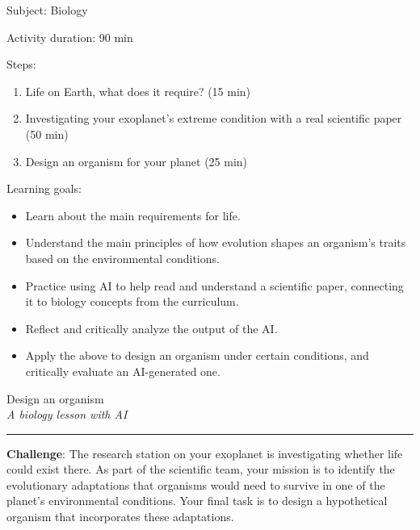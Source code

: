 \documentclass[12pt]{article}
\begin{document}
\vspace*{0.5\textheight}

Subject: Biology


\vspace{0.3cm}

Activity duration: 90 min

\vspace{0.5cm}

Steps:
\begin{enumerate}
    \item Life on Earth, what does it require? (15 min)
    \item Investigating your exoplanet's extreme condition with a real scientific paper (50 min)
    \item Design an organism for your planet (25 min)
\end{enumerate}

Learning goals:

\begin{itemize}
    \item Learn about the main requirements for life.
\item Understand the main principles of how evolution shapes an organism's traits based on the environmental conditions.
\item Practice using AI to help read and understand a scientific paper, connecting it to biology concepts from the curriculum.
\item Reflect and critically analyze the output of the AI.
\item Apply the above to design an organism under certain conditions, and critically evaluate an AI-generated one.



\end{itemize}

\newpage

\begin{center}
    {\LARGE \color{maincolor} Design an organism}\\[5pt]
    {\large \textit{A biology lesson with AI}}\\
    \rule{\linewidth}{1pt}
\end{center}

\vspace{0.5cm}

\begin{importantbox}
\textbf{Challenge}: The research station on your exoplanet is investigating whether life could exist there. As part of the scientific team, your mission is to identify the evolutionary adaptations that organisms would need to survive in one of the planet's environmental conditions. Your final task is to design a hypothetical organism that incorporates these adaptations.
\end{importantbox}
\end{document}
